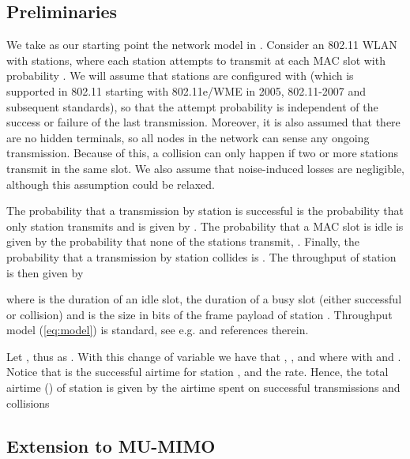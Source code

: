 \documentclass[11pt]{amsart}
\begin{document}
\subsection{Preliminaries}
We take as our starting point the network model in \cite{5910091}. Consider an 802.11 WLAN with  stations, where each station  attempts to transmit at each MAC slot with probability . We will assume that stations are configured with  (which is supported in 802.11 starting with 802.11e/WME in 2005, 802.11-2007 and subsequent standards), so that the attempt probability is independent of the success or failure of the last transmission. Moreover, it is also assumed that there are no hidden terminals, so all nodes in the network can sense any ongoing transmission.  Because of this, a collision can only happen if two or more stations transmit in the same slot. We also assume that noise-induced losses are negligible, although this assumption could be relaxed.

The probability that a transmission by station  is successful is the probability that only station  transmits and is given by . The probability that a MAC slot is idle is given by the probability that none of the stations transmit, . Finally, the probability that a transmission by station  collides is . The throughput of station  is then given by

where  is the duration of an idle slot,  the duration of a busy slot (either successful or collision) and  is the size in bits of the frame payload of station .   Throughput model (\ref{eq:model}) is standard, see e.g.  \cite{5910091,6009216,4100720} and references therein.

Let , thus  as . With this change of variable we have that ,  , and 
 where  with  and . Notice that  is the successful airtime for station , and  the rate. Hence, the total airtime  () of station  is given by the airtime spent on successful transmissions and collisions


\subsection{Extension to MU-MIMO}
\label{sec:muextension}
\end{document}
